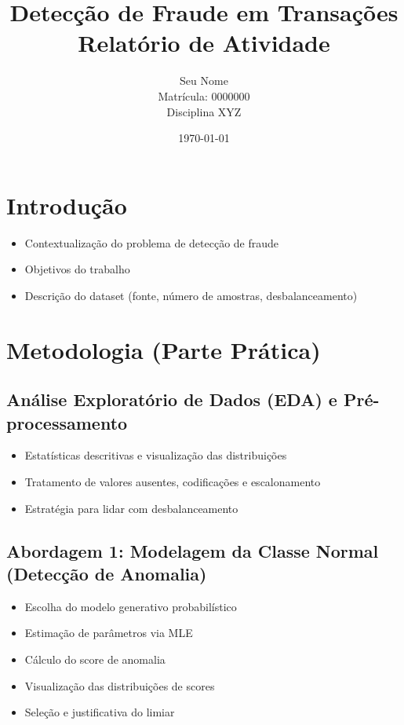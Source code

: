 \documentclass[a4paper,12pt]{article}
\title{Detecção de Fraude em Transações \\ \large Relatório de Atividade}
\author{Seu Nome \\ Matrícula: 0000000 \\ Disciplina XYZ}
\date{\today}
\begin{document}
\maketitle
\thispagestyle{empty}

\newpage
\tableofcontents
\thispagestyle{empty}

\newpage
{}

\section{Introdução}
\label{sec:introducao}
\begin{itemize}
  \item Contextualização do problema de detecção de fraude
  \item Objetivos do trabalho
  \item Descrição do dataset (fonte, número de amostras, desbalanceamento)
\end{itemize}

\section{Metodologia (Parte Prática)}
\label{sec:metodologia}

\subsection{Análise Exploratório de Dados (EDA) e Pré-processamento}
\label{subsec:eda}
\begin{itemize}
  \item Estatísticas descritivas e visualização das distribuições
  \item Tratamento de valores ausentes, codificações e escalonamento
  \item Estratégia para lidar com desbalanceamento
\end{itemize}

\subsection{Abordagem 1: Modelagem da Classe Normal (Detecção de Anomalia)}
\label{subsec:abordagem1}
\begin{itemize}
  \item Escolha do modelo generativo probabilístico
  \item Estimação de parâmetros via MLE
  \item Cálculo do score de anomalia
  \item Visualização das distribuições de scores
  \item Seleção e justificativa do limiar
\end{itemize}
\end{document}
